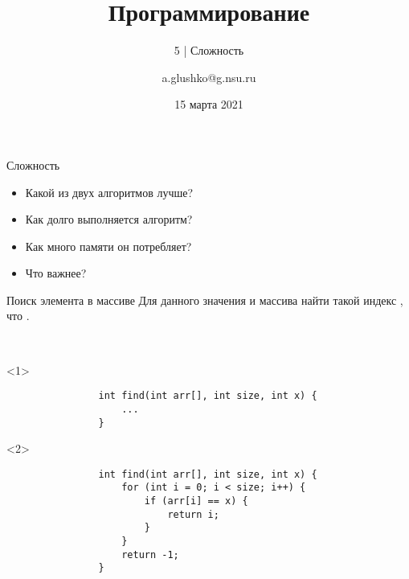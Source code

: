 \documentclass[aspectratio=169,14pt]{beamer}
\title{Программирование}
\subtitle{5 | Сложность}
\author{a.glushko@g.nsu.ru}
\date{15 марта 2021}
\begin{document}
    \begin{frame}
        \titlepage
    \end{frame}

    \begin{frame}{Сложность}
        \begin{itemize}
            \item Какой из двух алгоритмов лучше?
            \item Как долго выполняется алгоритм?
            \item Как много памяти он потребляет?
            \item<2> Что важнее?
        \end{itemize}
    \end{frame}

    \begin{frame}[fragile]{Поиск элемента в массиве}
        Для данного значения  и массива  найти такой индекс , \\что .

        ~\\
        \begin{onlyenv}<1>
            \begin{verbatim}
                int find(int arr[], int size, int x) {
                    ...
                }
            \end{verbatim}
        \end{onlyenv}
        \begin{onlyenv}<2>
            \begin{verbatim}
                int find(int arr[], int size, int x) {
                    for (int i = 0; i < size; i++) {
                        if (arr[i] == x) {
                            return i;
                        }
                    }
                    return -1;
                }
            \end{verbatim}
        \end{onlyenv}
    \end{frame}
\end{document}
